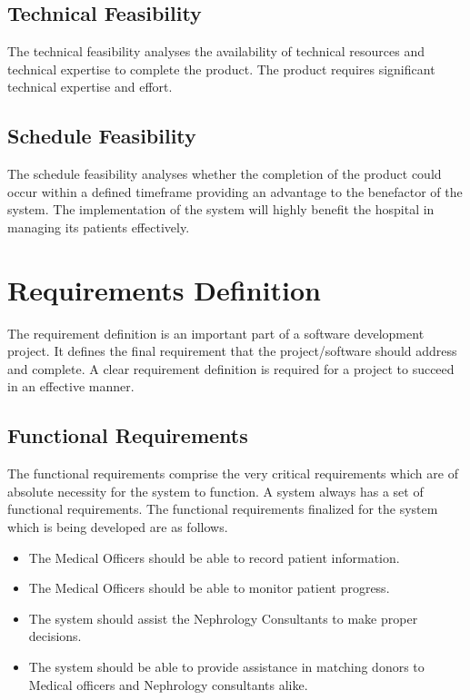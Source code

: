 \documentclass[12pt,a4paper]{report}
\begin{document}
\subsection{Technical Feasibility}
The technical feasibility analyses the availability of technical resources and technical expertise to complete the product. The product requires significant technical expertise and effort. 

\subsection{Schedule Feasibility}
The schedule feasibility analyses whether the completion of the product could occur within a defined timeframe providing an advantage to the benefactor of the system. The implementation of the system will highly benefit the hospital in managing its patients effectively. 

\section{Requirements Definition}
The requirement definition is an important part of a software development project. It defines the final requirement that the project/software should address and complete. A clear requirement definition is required for a project to succeed in an effective manner.
\subsection{Functional Requirements}
The functional requirements comprise the very critical requirements which are of absolute necessity for the system to function. A system always has a set of functional requirements. The functional requirements finalized for the system which is being developed are as follows.
\begin{itemize}
\item The Medical Officers should be able to record patient information.
\item The Medical Officers should be able to monitor patient progress.
\item The system should assist the Nephrology Consultants to make proper decisions.
\item The system should be able to provide assistance in matching donors to Medical officers and Nephrology consultants alike.
\end{itemize}
\end{document}
